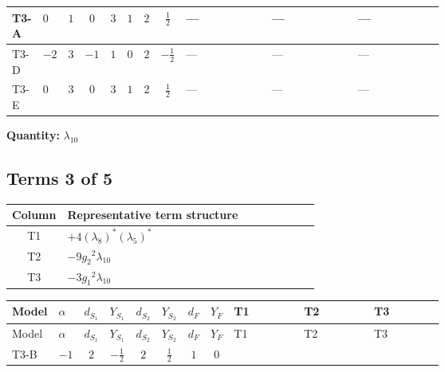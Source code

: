 \documentclass[8pt]{article}
\begin{document}
\begin{landscape}
\begin{longtable}{@{}llcccccc >{\raggedright\arraybackslash}p{0.21\linewidth} >{\raggedright\arraybackslash}p{0.21\linewidth} >{\raggedright\arraybackslash}p{0.21\linewidth}@{}}
\midrule
T3-A & $0$ & $1$ & $0$ & $3$ & $1$ & $2$ & $\frac{1}{2}$ & --- & --- & --- \\
\midrule
T3-D & $-2$ & $3$ & $-1$ & $1$ & $0$ & $2$ & $-\frac{1}{2}$ & --- & --- & --- \\
\midrule
T3-E & $0$ & $3$ & $0$ & $3$ & $1$ & $2$ & $\frac{1}{2}$ & --- & --- & --- \\
\midrule
\bottomrule
\end{longtable}
\clearpage
\noindent\textbf{Quantity: }$\lambda_{10}$\par\smallskip
\subsection*{Terms 3 of 5}
\begin{center}
\begin{tabular}{@{}c >{\raggedright\arraybackslash}p{0.82\linewidth}@{}}
\toprule
Column & Representative term structure \\
\midrule
T1 & \(\displaystyle +4 \left({\lambda_{8}}\right)^{*} \left({\lambda_5}\right)^{*}\) \\
\midrule
T2 & \(\displaystyle -9 {g_2}^2 {\lambda_{10}}\) \\
\midrule
T3 & \(\displaystyle -3 {g_1}^2 {\lambda_{10}}\) \\
\midrule
\bottomrule
\end{tabular}
\end{center}
\smallskip
\tiny
\begin{longtable}{@{}llcccccc >{\raggedright\arraybackslash}p{0.21\linewidth} >{\raggedright\arraybackslash}p{0.21\linewidth} >{\raggedright\arraybackslash}p{0.21\linewidth}@{}}
\toprule
Model & $\alpha$ & $d_{S_1}$ & $Y_{S_1}$ & $d_{S_2}$ & $Y_{S_2}$ & $d_F$ & $Y_F$ & T1 & T2 & T3 \\
\midrule
\endfirsthead
\toprule
Model & $\alpha$ & $d_{S_1}$ & $Y_{S_1}$ & $d_{S_2}$ & $Y_{S_2}$ & $d_F$ & $Y_F$ & T1 & T2 & T3 \\
\midrule
\endhead
T3-B & $-1$ & $2$ & $-\frac{1}{2}$ & $2$ & $\frac{1}{2}$ & $1$ & $0$ & \scriptsize\adjustbox{max width=\linewidth}{$\begin{gathered} +4 \left({\lambda_{8}}\right)^{*} \left({\lambda_5}\right)^{*}\end{gathered}$} & \scriptsize\adjustbox{max width=\linewidth}{$\begin{gathered} -9 {g_2}^2 {\lambda_{10}}\end{gathered}$} & \scriptsize\adjustbox{max width=\linewidth}{$\begin{gathered} -3 {g_1}^2 {\lambda_{10}}\end{gathered}$} \\

\end{longtable}
\end{landscape}
\end{document}
